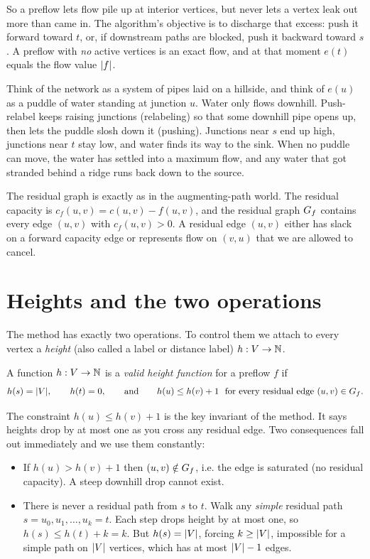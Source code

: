 So a preflow lets flow pile up at interior vertices, but never lets a vertex leak out more than came in. The algorithm's objective is to discharge that excess: push it forward toward $t$, or, if downstream paths are blocked, push it backward toward $s$. A preflow with \emph{no} active vertices is an exact flow, and at that moment $e(t)$ equals the flow value $\lvert f\rvert$.

\begin{intuitionbox}
Think of the network as a system of pipes laid on a hillside, and think of $e(u)$ as a puddle of water standing at junction $u$. Water only flows downhill. Push-relabel keeps raising junctions (relabeling) so that some downhill pipe opens up, then lets the puddle slosh down it (pushing). Junctions near $s$ end up high, junctions near $t$ stay low, and water finds its way to the sink. When no puddle can move, the water has settled into a maximum flow, and any water that got stranded behind a ridge runs back down to the source.
\end{intuitionbox}

The residual graph is exactly as in the augmenting-path world. The residual capacity is $c_f(u,v)=c(u,v)-f(u,v)$, and the residual graph $G_f$ contains every edge $(u,v)$ with $c_f(u,v)>0$. A residual edge $(u,v)$ either has slack on a forward capacity edge or represents flow on $(v,u)$ that we are allowed to cancel.

\section{Heights and the two operations}
\label{ch13:heights}

The method has exactly two operations. To control them we attach to every vertex a \emph{height} (also called a label or distance label) $h:V\to\mathbb{N}$.

\begin{definition}
\label{ch13:def-height}
A function $h:V\to\mathbb{N}$ is a \emph{valid height function} for a preflow $f$ if
\[
  h(s)=\lvert V\rvert,\qquad h(t)=0,\qquad\text{and}\qquad h(u)\le h(v)+1\ \text{ for every residual edge } (u,v)\in G_f.
\]
\end{definition}

The constraint $h(u)\le h(v)+1$ is the key invariant of the method. It says heights drop by at most one as you cross any residual edge. Two consequences fall out immediately and we use them constantly:

\begin{itemize}
  \item If $h(u)>h(v)+1$ then $(u,v)\notin G_f$, i.e. the edge is saturated (no residual capacity). A steep downhill drop cannot exist.
  \item There is never a residual path from $s$ to $t$. Walk any \emph{simple} residual path $s=u_0,u_1,\dots,u_k=t$. Each step drops height by at most one, so $h(s)\le h(t)+k=k$. But $h(s)=\lvert V\rvert$, forcing $k\ge\lvert V\rvert$, impossible for a simple path on $\lvert V\rvert$ vertices, which has at most $\lvert V\rvert-1$ edges.
\end{itemize}


